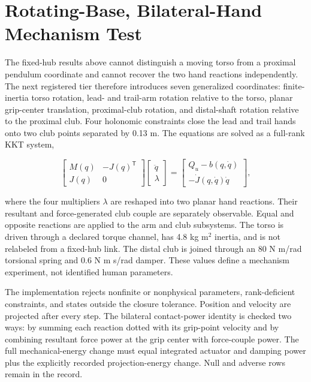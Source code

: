 \documentclass[
  letterpaper,
]{report}
\begin{document}
\section{Rotating-Base, Bilateral-Hand Mechanism
Test}\label{rotating-base-bilateral-hand-mechanism-test}

The fixed-hub results above cannot distinguish a moving torso from a
proximal pendulum coordinate and cannot recover the two hand reactions
independently. The next registered tier therefore introduces seven
generalized coordinates: finite-inertia torso rotation, lead- and
trail-arm rotation relative to the torso, planar grip-center
translation, proximal-club rotation, and distal-shaft rotation relative
to the proximal club. Four holonomic constraints close the lead and
trail hands onto two club points separated by 0.13 m. The equations are
solved as a full-rank KKT system,

\[
\begin{bmatrix}M(q)&-J(q)^\mathsf{T}\\J(q)&0\end{bmatrix}
\begin{bmatrix}\ddot q\\\lambda\end{bmatrix}
=
\begin{bmatrix}Q_u-b(q,\dot q)\\-\dot J(q,\dot q)\dot q\end{bmatrix},
\]

where the four multipliers \(\lambda\) are reshaped into two planar hand
reactions. Their resultant and force-generated club couple are
separately observable. Equal and opposite reactions are applied to the
arm and club subsystems. The torso is driven through a declared torque
channel, has 4.8 kg m\(^2\) inertia, and is not relabeled from a
fixed-hub link. The distal club is joined through an 80 N m/rad
torsional spring and 0.6 N m s/rad damper. These values define a
mechanism experiment, not identified human parameters.

The implementation rejects nonfinite or nonphysical parameters,
rank-deficient constraints, and states outside the closure tolerance.
Position and velocity are projected after every step. The bilateral
contact-power identity is checked two ways: by summing each reaction
dotted with its grip-point velocity and by combining resultant force
power at the grip center with force-couple power. The full
mechanical-energy change must equal integrated actuator and damping
power plus the explicitly recorded projection-energy change. Null and
adverse rows remain in the record.
\end{document}
